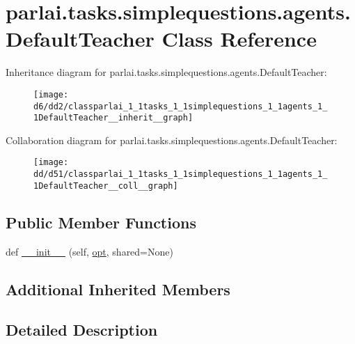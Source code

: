 \hypertarget{classparlai_1_1tasks_1_1simplequestions_1_1agents_1_1DefaultTeacher}{}\section{parlai.\+tasks.\+simplequestions.\+agents.\+Default\+Teacher Class Reference}
\label{classparlai_1_1tasks_1_1simplequestions_1_1agents_1_1DefaultTeacher}


Inheritance diagram for parlai.\+tasks.\+simplequestions.\+agents.\+Default\+Teacher\+:
\nopagebreak
\begin{figure}[H]
\begin{center}
\leavevmode
\texttt{[image: d6/dd2/classparlai\_1\_1tasks\_1\_1simplequestions\_1\_1agents\_1\_1DefaultTeacher\_\_inherit\_\_graph]}
\end{center}
\end{figure}


Collaboration diagram for parlai.\+tasks.\+simplequestions.\+agents.\+Default\+Teacher\+:
\nopagebreak
\begin{figure}[H]
\begin{center}
\leavevmode
\texttt{[image: dd/d51/classparlai\_1\_1tasks\_1\_1simplequestions\_1\_1agents\_1\_1DefaultTeacher\_\_coll\_\_graph]}
\end{center}
\end{figure}
\subsection*{Public Member Functions}
\begin{DoxyCompactItemize}
\item 
def \hyperlink{classparlai_1_1tasks_1_1simplequestions_1_1agents_1_1DefaultTeacher_a94f826fb0eec41783ccfdab6ba77c0d1}{\+\_\+\+\_\+init\+\_\+\+\_\+} (self, \hyperlink{classparlai_1_1core_1_1teachers_1_1FbDialogTeacher_af7a9ec497b9cd0292d7b8fa220da7c28}{opt}, shared=None)
\end{DoxyCompactItemize}
\subsection*{Additional Inherited Members}


\subsection{Detailed Description}


